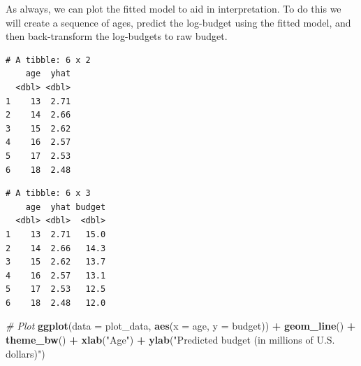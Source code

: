 \documentclass[]{book}
\newenvironment{Shaded}{\begin{snugshade}}{\end{snugshade}}
\newcommand{\CommentTok}[1]{\textcolor[rgb]{0.56,0.35,0.01}{\textit{#1}}}
\newcommand{\DataTypeTok}[1]{\textcolor[rgb]{0.13,0.29,0.53}{#1}}
\newcommand{\DecValTok}[1]{\textcolor[rgb]{0.00,0.00,0.81}{#1}}
\newcommand{\FloatTok}[1]{\textcolor[rgb]{0.00,0.00,0.81}{#1}}
\newcommand{\KeywordTok}[1]{\textcolor[rgb]{0.13,0.29,0.53}{\textbf{#1}}}
\newcommand{\NormalTok}[1]{#1}
\newcommand{\OperatorTok}[1]{\textcolor[rgb]{0.81,0.36,0.00}{\textbf{#1}}}
\newcommand{\StringTok}[1]{\textcolor[rgb]{0.31,0.60,0.02}{#1}}
\begin{document}
As always, we can plot the fitted model to aid in interpretation. To do this we will create a sequence of ages, predict the log-budget using the fitted model, and then back-transform the log-budgets to raw budget.

\begin{Shaded}
\end{Shaded}

\begin{verbatim}
# A tibble: 6 x 2
    age  yhat
  <dbl> <dbl>
1    13  2.71
2    14  2.66
3    15  2.62
4    16  2.57
5    17  2.53
6    18  2.48
\end{verbatim}

\begin{Shaded}
\end{Shaded}

\begin{verbatim}
# A tibble: 6 x 3
    age  yhat budget
  <dbl> <dbl>  <dbl>
1    13  2.71   15.0
2    14  2.66   14.3
3    15  2.62   13.7
4    16  2.57   13.1
5    17  2.53   12.5
6    18  2.48   12.0
\end{verbatim}

\begin{Shaded}
\begin{Highlighting}[]
\CommentTok{# Plot}
\KeywordTok{ggplot}\NormalTok{(}\DataTypeTok{data =}\NormalTok{ plot_data, }\KeywordTok{aes}\NormalTok{(}\DataTypeTok{x =}\NormalTok{ age, }\DataTypeTok{y =}\NormalTok{ budget)) }\OperatorTok{+}
\StringTok{    }\KeywordTok{geom_line}\NormalTok{() }\OperatorTok{+}
\StringTok{    }\KeywordTok{theme_bw}\NormalTok{() }\OperatorTok{+}
\StringTok{  }\KeywordTok{xlab}\NormalTok{(}\StringTok{"Age"}\NormalTok{) }\OperatorTok{+}
\StringTok{  }\KeywordTok{ylab}\NormalTok{(}\StringTok{"Predicted budget (in millions of U.S. dollars)"}\NormalTok{)}
\end{Highlighting}
\end{Shaded}
\end{document}
